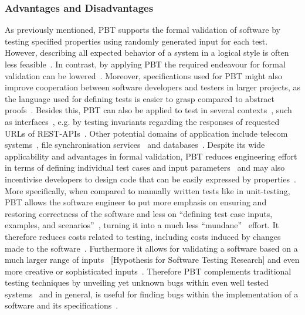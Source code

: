 \documentclass[runningheads]{llncs}
\begin{document}
\subsubsection{Advantages and Disadvantages}
As previously mentioned, PBT supports the formal validation of software by testing specified properties using randomly generated input for each test. However, describing all expected behavior of a system in a logical style is often less feasible~\cite{Chen2022,Koopman2012}. In contrast, by applying PBT the required endeavour for formal validation can be lowered~\cite{Hritcu2016,Chen2022,Paraskevopoulou2015}. Moreover, specifications used for PBT might also improve cooperation between software developers and testers in larger projects, as the language used for defining tests is easier to grasp compared to abstract proofs~\cite{Chen2022,Loescher2017}. Besides this, PBT can also be applied to test in several contexts~\cite{Karlsson2019}, such as interfaces~\cite{Karlsson2019,Francisco2013,LamelaSeijas2013}, e.g. by testing invariants regarding the responses of requested URLs of REST-APIs~\cite{Karlsson2019}. Other potential domains of application include telecom systems~\cite{Arts2006}, file synchronisation services~\cite{Hughes2016} and databases~\cite{Arts2015}. Despite its wide applicability and advantages in formal validation, PBT reduces engineering effort in terms of defining individual test cases and input parameters~\cite{Chen2022,Loescher2017,Corgozinho2023} and may also incentivise developers to design code that can be easily expressed by properties~\cite{Chen2022}. More specifically, when compared to manually written tests like in unit-testing, PBT allows the software engineer to put more emphasis on ensuring and restoring correctness of the software and less on ``defining test case inputs, examples, and scenarios''~\cite{Corgozinho2023}, turning it into a much less ``mundane''~\cite{Loescher2017} effort. It therefore reduces costs related to testing, including costs induced by changes made to the software~\cite{Chen2022,Loescher2017}. Furthermore it allows for validating a software based on a much larger range of inputs~\cite{Loescher2017} [Hypothesis for Software Testing Research] and even more creative or sophisticated inputs~\cite{Arts2015}. Therefore PBT complements traditional testing techniques by unveiling yet unknown bugs within even well tested systems~\cite{Arts2015,Hughes2016,Arts2006} and in general, is useful for finding bugs within the implementation of a software and its specifications~\cite{Chen2022,Fink1997,Loescher2017,Paraskevopoulou2015,Claessen2000,Corgozinho2023}.
\end{document}
